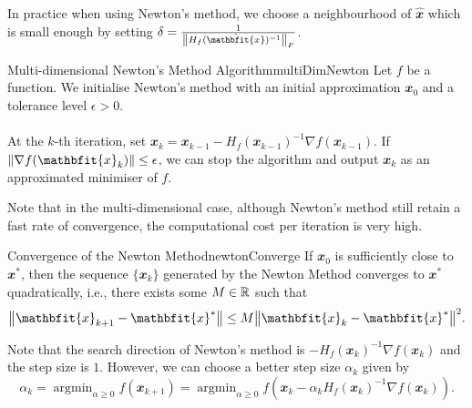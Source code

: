 \documentclass[math, code]{amznotes}
\theoremstyle{remark}
\DeclareMathOperator*{\argmin}{argmin}
\begin{document}
In practice when using Newton's method, we choose a neighbourhood of $\hat{\mathbfit{x}}$ which is small enough by setting $\delta = \frac{1}{\norm{H_f(\hat{\mathbfit{x}})^{-1}}_F}$.
\begin{tecbox}{Multi-dimensional Newton's Method Algorithm}{multiDimNewton}
    Let $f$ be a function. We initialise Newton's method with an initial approximation $\mathbfit{x}_0$ and a tolerance level $\epsilon > 0$.
    \\\\
    At the $k$-th iteration, set $\mathbfit{x}_k = \mathbfit{x}_{k - 1} - H_f(\mathbfit{x}_{k - 1})^{-1}\nabla f(\mathbfit{x}_{k - 1})$. If $\norm{\nabla f(\mathbfit{x}_k)} \leq \epsilon$, we can stop the algorithm and output $\mathbfit{x}_k$ as an approximated minimiser of $f$.
\end{tecbox}
Note that in the multi-dimensional case, although Newton's method still retain a fast rate of convergence, the computational cost per iteration is very high.
\begin{probox}{Convergence of the Newton Method}{newtonConverge}
    If $\mathbfit{x}_0$ is sufficiently close to $\mathbfit{x}^*$, then the sequence $\{\mathbfit{x}_k\}$ generated by the Newton Method converges to $\mathbfit{x}^*$ quadratically, i.e., there exists some $M \in \mathbb{R}$ such that
    \begin{equation*}
        \norm{\mathbfit{x}_{k + 1} - \mathbfit{x}^*} \leq M\norm{\mathbfit{x}_k - \mathbfit{x}^*}^2.
    \end{equation*}
\end{probox}
Note that the search direction of Newton's method is $-H_f(\mathbfit{x}_k)^{-1}\nabla f(\mathbfit{x}_k)$ and the step size is $1$. However, we can choose a better step size $\alpha_k$ given by
\begin{equation*}
    \alpha_k = \argmin_{\alpha \geq 0}f(\mathbfit{x}_{k + 1}) = \argmin_{\alpha \geq 0}f\left(\mathbfit{x}_k - \alpha_kH_f(\mathbfit{x}_k)^{-1}\nabla f(\mathbfit{x}_k)\right).
\end{equation*}
\end{document}

